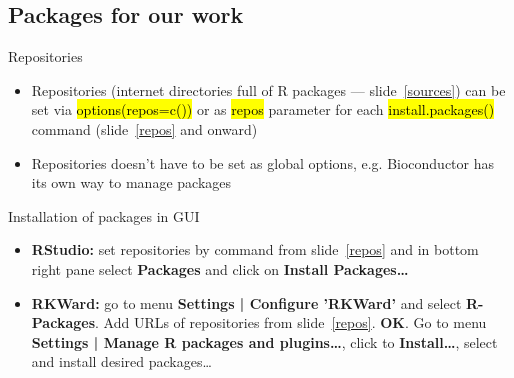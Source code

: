 \documentclass[compress, ucs, xelatex, 11pt, xcolor=svgnames,
  hyperref={
    bookmarks=true,
    unicode=true,
    colorlinks=true,
    pdftitle={Molecular data in R},
    plainpages=false,
    pdfauthor={Vojtech Zeisek},
    pdfsubject={Course about phylogeny and evolution in R},
    pdfcreator={XeLaTeX},
    pdfkeywords={R, evolution, phylogeny, molecular data},
    linkcolor=Tomato,
    anchorcolor=SaddleBrown,
    citecolor=Goldenrod,
    filecolor=DarkMagenta,
    menucolor=Sienna,
    urlcolor=DarkTurquoise,
    pdftex},
  url={hyphens, lowtilde} %
  ]{beamer}
\renewcommand{\texttt}[1]{\hl{\ttfamily #1}}
\begin{document}
\subsection{Packages for our work}

\begin{frame}{Repositories}
  \begin{itemize}
    \item Repositories (internet directories full of R packages --- slide~\ref{sources}) can be set via \texttt{options(repos=c())} or as \texttt{repos} parameter for each \texttt{install.packages()} command (slide~\ref{repos} and onward)
    \item Repositories doesn't have to be set as global options, e.g. Bioconductor has its own way to manage packages
  \end{itemize}
  \begin{block}{Installation of packages in GUI}
    \begin{itemize}
      \item \textbf{RStudio:} set repositories by command from slide~\ref{repos} and in bottom right pane select \textbf{Packages} and click on \textbf{Install Packages\ldots}
      \item \textbf{RKWard:} go to menu \textbf{Settings | Configure 'RKWard'} and select \textbf{R-Packages}. Add URLs of repositories from slide~\ref{repos}. \textbf{OK}. Go to menu \textbf{Settings | Manage R packages and plugins\ldots}, click to \textbf{Install\ldots}, select and install desired packages\ldots
    \end{itemize}
  \end{block}
\end{frame}
\end{document}
